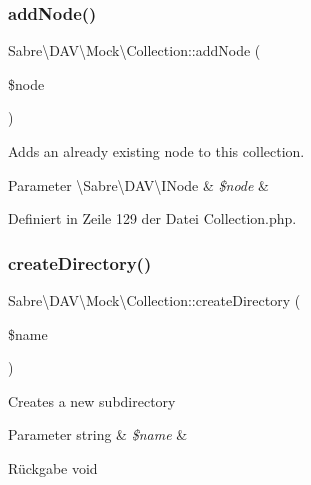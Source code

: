 \subsubsection{\texorpdfstring{add\+Node()}{addNode()}}
{\footnotesize\ttfamily Sabre\textbackslash{}\+D\+A\+V\textbackslash{}\+Mock\textbackslash{}\+Collection\+::add\+Node (\begin{DoxyParamCaption}\item[{\textbackslash{}\mbox{\hyperlink{interface_sabre_1_1_d_a_v_1_1_i_node}{Sabre\textbackslash{}\+D\+A\+V\textbackslash{}\+I\+Node}}}]{\$node }\end{DoxyParamCaption})}

Adds an already existing node to this collection.


\begin{DoxyParams}[1]{Parameter}
\textbackslash{}\+Sabre\textbackslash{}\+D\+A\+V\textbackslash{}\+I\+Node & {\em \$node} & \\
\hline
\end{DoxyParams}


Definiert in Zeile 129 der Datei Collection.\+php.

\mbox{\label{class_sabre_1_1_d_a_v_1_1_mock_1_1_collection_a48e2f0896c892cdc0c3c6fe87b9da153}} 
\subsubsection{\texorpdfstring{create\+Directory()}{createDirectory()}}
{\footnotesize\ttfamily Sabre\textbackslash{}\+D\+A\+V\textbackslash{}\+Mock\textbackslash{}\+Collection\+::create\+Directory (\begin{DoxyParamCaption}\item[{}]{\$name }\end{DoxyParamCaption})}

Creates a new subdirectory


\begin{DoxyParams}[1]{Parameter}
string & {\em \$name} & \\
\hline
\end{DoxyParams}
\begin{DoxyReturn}{Rückgabe}
void 
\end{DoxyReturn}


